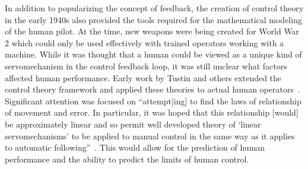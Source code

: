 In addition to popularizing the concept of feedback, the creation of control theory in the early 1940s also provided the tools required for the mathematical modeling of the human pilot.
At the time, new weapons were being created for World War 2 which could only be used effectively with trained operators working with a machine.
While it was thought that a human could be viewed as a unique kind of servomechanism in the control feedback loop, it was still unclear what factors affected human performance.
Early work by Tustin and others extended the control theory framework and applied these theories to actual human operators~\citep{tustin1944investigation}.
Significant attention was focused on ``attempt[ing] to find the laws of relationship of movement and error.
In particular, it was hoped that this relationship [would] be approximately linear and so permit well developed theory of `linear servomechanisms' to be applied to manual control in the same way as it applies to automatic following''~\citep{tustin1944investigation}.
This would allow for the prediction of human performance and the ability to predict the limits of human control.

